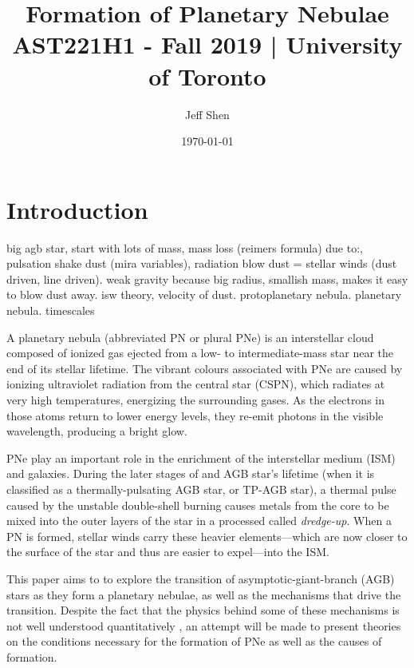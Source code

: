 \documentclass[a4paper,12pt]{article}
\begin{document}
\title{Formation of Planetary Nebulae\\
    \Large AST221H1 - Fall 2019 | University of Toronto}
\author{Jeff Shen}
\date{\today}
\maketitle

\section{Introduction}

{\huge big agb star, start with lots of mass, mass loss (reimers formula) due to:, pulsation shake dust (mira variables), radiation blow dust = stellar winds (dust driven, line driven). weak gravity because big radius, smallish mass, makes it easy to blow dust away. isw theory, velocity of dust. protoplanetary nebula. planetary nebula. timescales}

A planetary nebula (abbreviated PN or plural PNe) is an interstellar cloud composed of ionized gas ejected from a low- to intermediate-mass star near the end of its stellar lifetime. The vibrant colours associated with PNe are caused by ionizing ultraviolet radiation from the central star (CSPN), which radiates at very high temperatures, energizing the surrounding gases. As the electrons in those atoms return to lower energy levels, they re-emit photons in the visible wavelength, producing a bright glow. 

PNe play an important role in the enrichment of the interstellar medium (ISM) and galaxies. During the later stages of and AGB star's lifetime (when it is classified as a thermally-pulsating AGB star, or TP-AGB star), a thermal pulse caused by the unstable double-shell burning causes metals from the core to be mixed into the outer layers of the star in a processed called \textit{dredge-up}. When a PN is formed, stellar winds carry these heavier elements—which are now closer to the surface of the star and thus are easier to expel—into the ISM. \cite{iben} 

This paper aims to to explore the transition of asymptotic-giant-branch (AGB) stars as they form a planetary nebulae, as well as the mechanisms that drive the transition. Despite the fact that the physics behind some of these mechanisms is not well understood quantitatively \cite{schoenberner}, an attempt will be made to present theories on the conditions necessary for the formation of PNe as well as the causes of formation.
\end{document}
